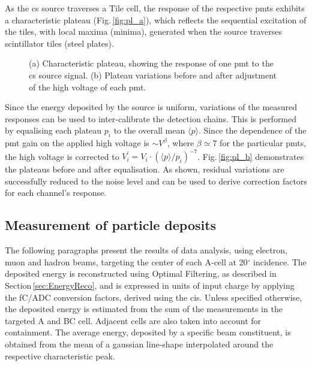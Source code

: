 As the \gls{cs} source traverses a Tile cell, the response of the respective \glspl{pmt} exhibits a characteristic
plateau (Fig.\,\ref{fig:pl_a}), which reflects the sequential excitation of the tiles, with local maxima (minima), 
generated when the source traverses scintillator tiles (steel plates).
%
\begin{figure}[!tb]
  \centering
  \caption{(a) Characteristic plateau, showing the response of one \gls{pmt} to the \gls{cs} source signal.
  (b) Plateau variations before and after adjustment of the high voltage of each \gls{pmt}.}
  \label{fig:pl}
\end{figure}
%
Since the energy deposited by the source is uniform, variations of the measured responses can be used to inter-calibrate 
the detection chains. This is performed by equalising each plateau $p_{i}$ to the overall mean $\langle p \rangle$. Since 
the dependence of the \gls{pmt} gain on the applied high voltage is $\sim$$V^{\beta}$, where $\beta\simeq 7$ for the 
particular \glspl{pmt}, the high voltage is corrected to $V^{'}_{i} = V_{i}\cdot(\langle p \rangle/p_{i})^{-7}$. 
Fig.\,\ref{fig:pl_b} demonstrates the plateaus before and after equalisation. As shown, residual variations are 
successfully reduced to the noise level and can be used to derive correction factors for each channel's response.

\subsection{Measurement of particle deposits}
\label{subsec:TBparticles}

The following paragraphs present the results of data analysis, using electron, muon and hadron beams, targeting the center of
each A-cell at 20$^{\circ}$ incidence. The deposited energy is reconstructed using Optimal Filtering, as described in 
Section\,\ref{sec:EnergyReco}, and is expressed in units of input charge by applying the fC/ADC conversion factors, derived using 
the \gls{cis}. Unless specified otherwise, the deposited energy is estimated from the sum of the measurements in the targeted 
A and BC cell. Adjacent cells are also taken into account for containment. The average energy, deposited by a specific beam 
constituent, is obtained from the mean of a gaussian line-shape interpolated around the respective characteristic peak.

